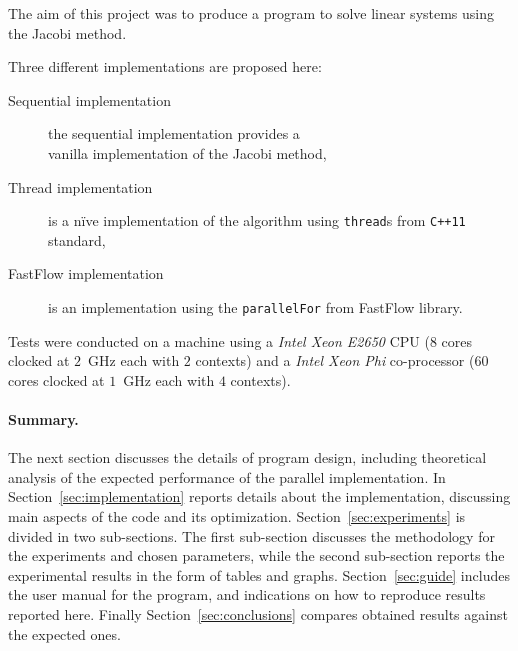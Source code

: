 The aim of this project was to produce a program to solve linear systems using the Jacobi method.

Three different implementations are proposed here:
\begin{description}
    \item[Sequential implementation] the sequential implementation provides a \\    
    vanilla implementation of the Jacobi method,
    \item[Thread implementation] is a n\"ive implementation of the algorithm using \lstinline+thread+s from \lstinline|C++11| standard,  
    \item[FastFlow implementation] is an implementation using the \lstinline+parallelFor+ from FastFlow library.
\end{description}

Tests were conducted on a machine using a \emph{Intel Xeon E2650} CPU ($8$ cores clocked at $2$~\si{\giga\hertz} each with $2$ contexts) and a \emph{Intel Xeon Phi} co-processor ($60$ cores clocked at $1$~\si{\giga\hertz} each with $4$ contexts).

\paragraph{Summary.} The next section discusses the details of program design, including theoretical analysis of the expected performance of the parallel implementation.
In Section~\ref{sec:implementation} reports details about the implementation, discussing main aspects of the code and its optimization.
Section~\ref{sec:experiments} is divided in two sub-sections. 
The first sub-section discusses the methodology for the experiments and chosen parameters, while the second sub-section reports the experimental results in the form of tables and graphs.
Section~\ref{sec:guide} includes the user manual for the program, and indications on how to reproduce results reported here.
Finally Section~\ref{sec:conclusions} compares obtained results against the expected ones.